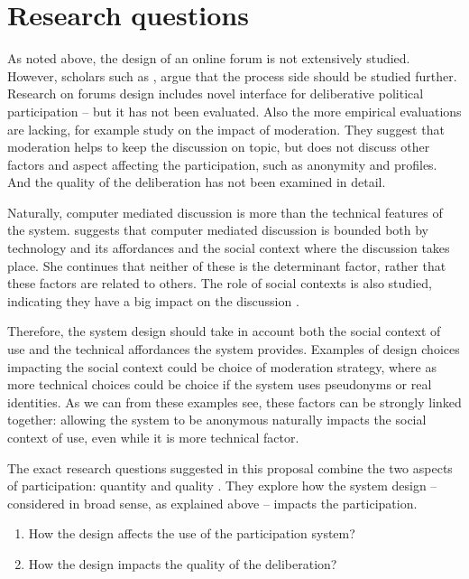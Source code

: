 \documentclass[journal,a4paper]{IEEEtran}
\begin{document}
\section{Research questions}
As noted above, the design of an online forum is not extensively studied. However, scholars such as , argue that the process side should be studied further.  Research on forums design includes  novel interface for deliberative political participation -- but it has not been evaluated. Also the more empirical evaluations are lacking, for example  study on the impact of moderation. They suggest that moderation helps to keep the discussion on topic, but does not discuss other factors and aspect affecting the participation, such as anonymity and profiles. And the quality of the deliberation has not been examined in detail.

Naturally, computer mediated discussion is more than the technical features of the system.  suggests that computer mediated discussion is bounded both by technology and its affordances and the social context where the discussion takes place. She continues that neither of these is the determinant factor, rather that these factors are related to others. The role of social contexts is also studied, indicating they have a big impact on the discussion \cite{sukumaran11,baek11}.

Therefore, the system design should take in account both the social context of use and the technical affordances the system provides. Examples of design choices impacting the social context could be choice of moderation strategy, where as more technical choices could be choice if the system uses pseudonyms or real identities. As we can from these examples see, these factors can be strongly linked together: allowing the system to be anonymous naturally impacts the social context of use, even while it is more technical factor.

The exact research questions suggested in this proposal combine the two aspects of participation: quantity and quality . They explore how the system design -- considered in broad sense, as explained above -- impacts the participation.

\begin{enumerate}
\item How the design affects the use of the participation system?
\item How the design impacts the quality of the deliberation?
\end{enumerate}
\end{document}

